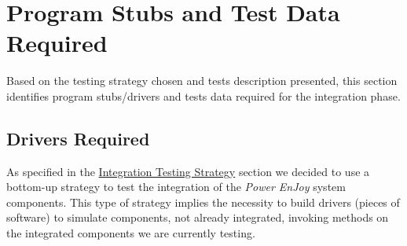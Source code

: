 \section{Program Stubs and Test Data Required}
Based on the testing strategy chosen and tests description presented, this section identifies program stubs/drivers and tests data required for the integration phase.

\subsection{Drivers Required}
As specified in the \hyperref[sec:intStrategy]{Integration Testing Strategy} section we decided to use a bottom-up strategy to test the integration of the \emph{Power EnJoy} system components. This type of strategy implies the necessity to build drivers (pieces of software) to simulate components, not already integrated, invoking methods on the integrated components we are currently testing. \\

